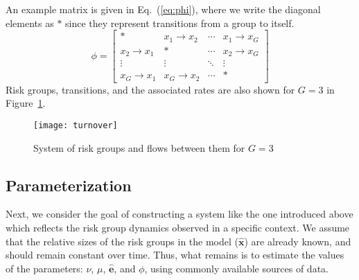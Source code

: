 An example matrix is given in Eq.~(\ref{eq:phi}),
where we write the diagonal elements as $*$ since they represent
transitions from a group to itself.
\begin{equation}\label{eq:phi}
\phi = \left[\begin{array}{cccc}
	         *          & x_1  \rightarrow x_2 & \cdots & x_1 \rightarrow x_G \\[0.5em]
	x_2 \rightarrow x_1 &          *           & \cdots & x_2 \rightarrow x_G \\[0.5em]
	      \vdots        &        \vdots        & \ddots &       \vdots        \\[0.5em]
	x_G \rightarrow x_1 & x_G \rightarrow x_2  & \cdots &          *
\end{array}\right]
\end{equation}
Risk groups, transitions, and the associated rates
are also shown for $G = 3$ in Figure~\ref{fig:system}.
\begin{figure}
  \centering
  \texttt{[image: turnover]}
  \caption{System of risk groups and flows between them for $G = 3$}
  \label{fig:system}
\end{figure}
\subsection{Parameterization}\label{ss:params}
Next, we consider the goal of constructing a system like the one introduced above
which reflects the risk group dynamics observed in a specific context.
We assume that the relative sizes of the risk groups in the model ($\bm{\hat{x}}$)
are already known, and should remain constant over time.
Thus, what remains is to estimate the values of the parameters:
$\nu$, $\mu$, $\bm{\hat{e}}$, and $\phi$,
using commonly available sources of data.
